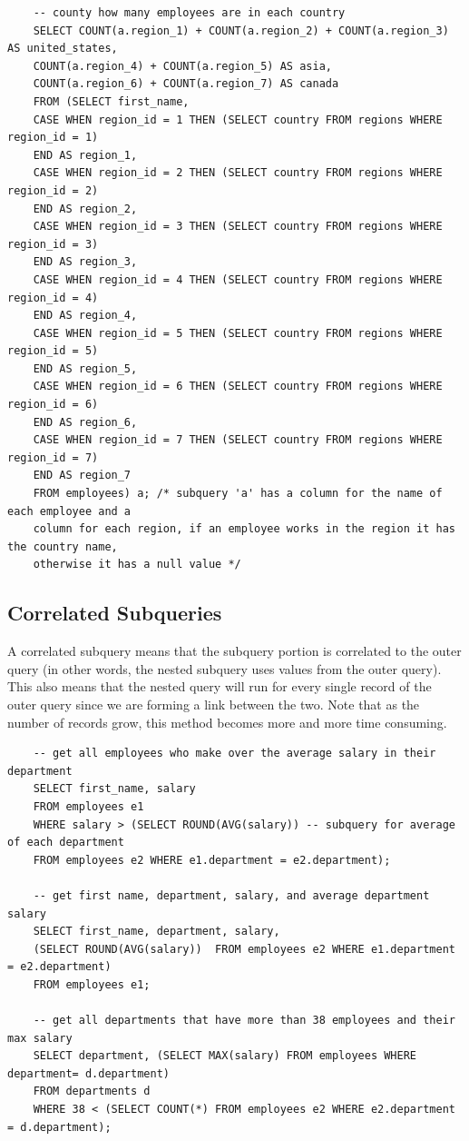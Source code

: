 \documentclass[11pt, a4paper]{article}
\begin{document}
\begin{spacing}{1.1}
\begin{lstlisting}
	-- county how many employees are in each country
	SELECT COUNT(a.region_1) + COUNT(a.region_2) + COUNT(a.region_3) AS united_states,
	COUNT(a.region_4) + COUNT(a.region_5) AS asia,
	COUNT(a.region_6) + COUNT(a.region_7) AS canada
	FROM (SELECT first_name,
	CASE WHEN region_id = 1 THEN (SELECT country FROM regions WHERE region_id = 1) 
	END AS region_1,
	CASE WHEN region_id = 2 THEN (SELECT country FROM regions WHERE region_id = 2) 
	END AS region_2,
	CASE WHEN region_id = 3 THEN (SELECT country FROM regions WHERE region_id = 3) 
	END AS region_3,
	CASE WHEN region_id = 4 THEN (SELECT country FROM regions WHERE region_id = 4) 
	END AS region_4,
	CASE WHEN region_id = 5 THEN (SELECT country FROM regions WHERE region_id = 5) 
	END AS region_5,
	CASE WHEN region_id = 6 THEN (SELECT country FROM regions WHERE region_id = 6) 
	END AS region_6,
	CASE WHEN region_id = 7 THEN (SELECT country FROM regions WHERE region_id = 7) 
	END AS region_7
	FROM employees) a; /* subquery 'a' has a column for the name of each employee and a 
	column for each region, if an employee works in the region it has the country name,
	otherwise it has a null value */  \end{lstlisting} \vspace*{5mm}
	
	\subsection{Correlated Subqueries}
	A correlated subquery means that the subquery portion is correlated to the outer query (in other words, the nested subquery uses values from the outer query). This also means that the nested query will run for every single record of the outer query since we are forming a link between the two. Note that as the number of records grow, this method becomes more and more time consuming.
	\begin{lstlisting}
	-- get all employees who make over the average salary in their department
	SELECT first_name, salary
	FROM employees e1
	WHERE salary > (SELECT ROUND(AVG(salary)) -- subquery for average of each department
	FROM employees e2 WHERE e1.department = e2.department);
	
	-- get first name, department, salary, and average department salary                  
	SELECT first_name, department, salary,
	(SELECT ROUND(AVG(salary))  FROM employees e2 WHERE e1.department = e2.department) 
	FROM employees e1;
	
	-- get all departments that have more than 38 employees and their max salary
	SELECT department, (SELECT MAX(salary) FROM employees WHERE department= d.department)
	FROM departments d
	WHERE 38 < (SELECT COUNT(*) FROM employees e2 WHERE e2.department = d.department); \end{lstlisting} \newpage
	

\end{spacing}
\end{document}
